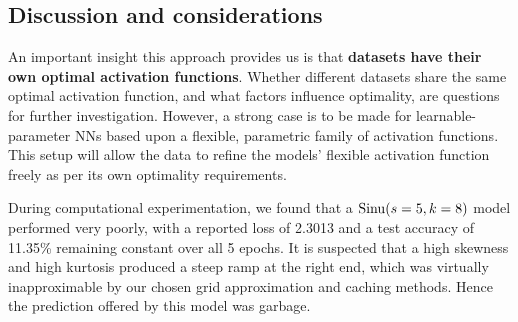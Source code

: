 \subsection{Discussion and considerations}
An important insight this approach provides us is that \textbf{datasets have their own optimal activation functions}. Whether different datasets share the same optimal activation function, and what factors influence optimality, are questions for further investigation. However, a strong case is to be made for learnable-parameter NNs based upon a flexible, parametric family of activation functions. This setup will allow the data to refine the models' flexible activation function freely as per its own optimality requirements.

During computational experimentation, we found that a $\operatorname*{Sinu}(s=5, k=8)$ model performed very poorly, with a reported loss of 2.3013 and a test accuracy of 11.35\% remaining constant over all 5 epochs. It is suspected that a high skewness and high kurtosis produced a steep ramp at the right end, which was virtually inapproximable by our chosen grid approximation and caching methods. Hence the prediction offered by this model was garbage.